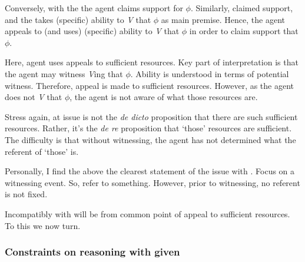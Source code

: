 \begin{note}
  Conversely, with the \aben{} the agent claims support for \(\phi\).
  Similarly, claimed support, and the \aben{} takes (specific) ability to \emph{V} that \(\phi\) as main premise.
  Hence, the agent appeals to (and uses) (specific) ability to \emph{V} that \(\phi\) in order to claim support that \(\phi\).

  Here, agent uses appeals to sufficient resources.
  Key part of \WR{} interpretation is that the agent may witness \emph{V}ing that \(\phi\).
  Ability is understood in terms of potential witness.
  Therefore, appeal is made to sufficient resources.
  However, as the agent does not \emph{V} that \(\phi\), the agent is not aware of what those resources are.

  Stress again, at issue is not the \emph{de dicto} proposition that there are such sufficient resources.
  Rather, it's the \emph{de re} proposition that `those' resources are sufficient.
  The difficulty is that without witnessing, the agent has not determined what the referent of `those' is.

  Personally, I find the above the clearest statement of the issue with \WR{}.
  Focus on a witnessing event.
  So, refer to something.
  However, prior to witnessing, no referent is not fixed.
\end{note}

\begin{note}
  Incompatibly with \ESU{} will be from common point of appeal to sufficient resources.
  To this we now turn.
\end{note}

\subsubsection{Constraints on reasoning with \gsi{} given \ESU{}}
\label{sec:incomp-wr-ura}

